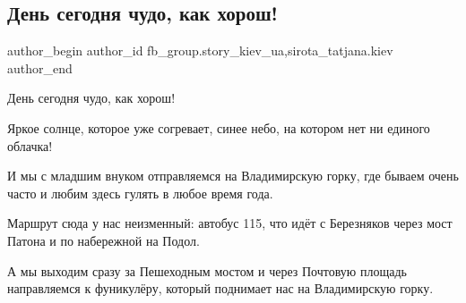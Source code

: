  
 
 
 
 
 
\subsection{День сегодня чудо, как хорош!}
\label{sec:15_02_2022.fb.fb_group.story_kiev_ua.1.den_segodnja_chudo}
 
\ifcmt
 author_begin
   author_id fb_group.story_kiev_ua,sirota_tatjana.kiev
 author_end
\fi

День сегодня чудо, как хорош!

Яркое солнце, которое уже согревает, синее небо, на котором нет ни единого
облачка!

И мы с младшим внуком отправляемся на Владимирскую горку, где бываем очень часто
и любим здесь гулять в любое время года.

Маршрут сюда у нас неизменный: автобус 115, что идёт с Березняков через мост
Патона и по набережной на Подол.

\raggedcolumns
\begin{multicols}{4} %
\setlength{\parindent}{0pt}





\end{multicols} %

А мы выходим сразу за Пешеходным мостом и через Почтовую площадь направляемся к
фуникулёру, который поднимает нас на Владимирскую горку.

